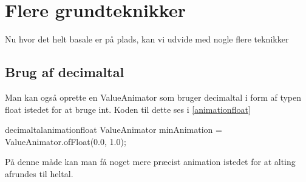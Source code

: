 \section{Flere grundteknikker}
Nu hvor det helt basale er på plads, kan vi udvide med nogle flere teknikker
\subsection{Brug af decimaltal}
Man kan også oprette en ValueAnimator som bruger decimaltal i form af typen float istedet for at bruge int. Koden til dette ses i \autoref{animationfloat}
\begin{JavaCode}{decimaltal}{animationfloat}
	ValueAnimator minAnimation = ValueAnimator.ofFloat(0.0, 1.0);
\end{JavaCode}
På denne måde kan man få noget mere præcist animation istedet for at alting afrundes til heltal.

